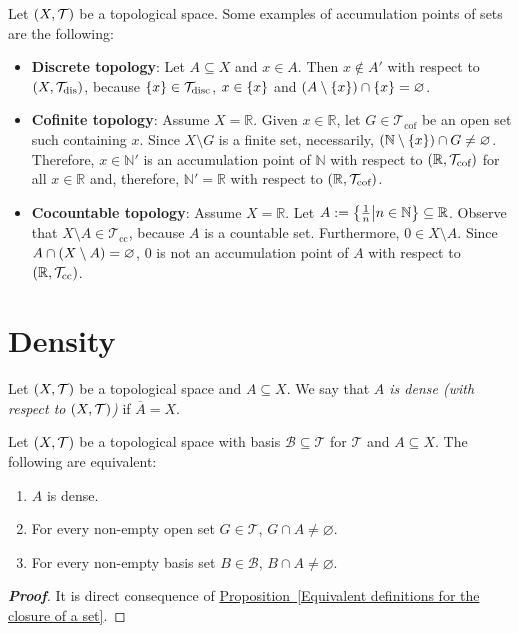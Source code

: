 \begin{example}
  Let $\left(X,\mathcal{T}\right)$ be a topological space. Some examples of accumulation points of sets are the following:

  \begin{itemize}
    \item \textbf{Discrete topology}: Let $A\subseteq X$ and $x\in A$. Then $x\notin A'$ with respect to $\left(X,\mathcal{T}_{\text{dis}}\right)$, because $\left\{x\right\}\in\mathcal{T}_{\text{disc}}$, $x\in\left\{x\right\}$ and $\left(A\setminus\left\{x\right\}\right)\cap\left\{x\right\}=\varnothing$.
    \item \textbf{Cofinite topology}: Assume $X=\mathbb{R}$. Given $x\in\mathbb{R}$, let $G\in\mathcal{T}_{\text{cof}}$ be an open set such containing $x$. Since $X\setminus G$ is a finite set, necessarily, $\left(\mathbb{N}\setminus\left\{x\right\}\right)\cap G\neq\varnothing$. Therefore, $x\in\mathbb{N}'$ is an accumulation point of $\mathbb{N}$ with respect to $\left(\mathbb{R},\mathcal{T}_{\text{cof}}\right)$ for all $x\in\mathbb{R}$ and, therefore, $\mathbb{N}'=\mathbb{R}$ with respect to $\left(\mathbb{R},\mathcal{T}_{\text{cof}}\right)$.
    \item \textbf{Cocountable topology}: Assume $X=\mathbb{R}$. Let $A:=\left\{\frac{1}{n}\middle|n\in\mathbb{N}\right\}\subseteq\mathbb{R}$. Observe that $X\setminus A\in\mathcal{T}_{\text{cc}}$, because $A$ is a countable set. Furthermore, $0\in X\setminus A$. Since $A\cap\left(X\setminus A\right)=\varnothing$, $0$ is not an accumulation point of $A$ with respect to $\left(\mathbb{R},\mathcal{T}_{\text{cc}}\right)$.
  \end{itemize}
\end{example}

\section{Density}

\begin{definition}
  Let $\left(X,\mathcal{T}\right)$ be a topological space and $A\subseteq X$. We say that \emph{$A$ is dense (with respect to $\left(X,\mathcal{T}\right)$)} if $\overline{A}=X$.
\end{definition}

\begin{proposition}
  Let $\left(X,\mathcal{T}\right)$ be a topological space with basis $\mathcal{B}\subseteq\mathcal{T}$ for $\mathcal{T}$ and $A\subseteq X$. The following are equivalent:

  \begin{enumerate}
      \item $A$ is dense.
      \item For every non-empty open set $G\in\mathcal{T}$, $G\cap A\neq\varnothing$.
      \item For every non-empty basis set $B\in\mathcal{B}$, $B\cap A\neq\varnothing$.
  \end{enumerate}
  \begin{proof}[\rm\textbf{Proof}]
    It is direct consequence of \hyperref[Equivalent definitions for the closure of a set]{Proposition~\ref*{Equivalent definitions for the closure of a set}}.
  \end{proof}
\end{proposition}


